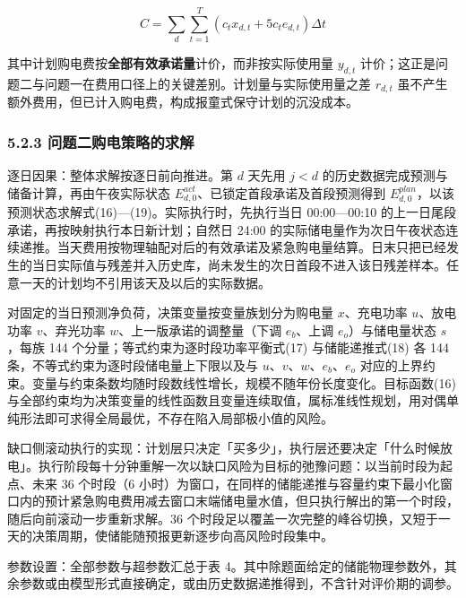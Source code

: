 \documentclass[12pt,a4paper]{ctexart}
\begin{document}
\begin{equation}
C=\sum_{d}\sum_{t=1}^{T}\left(c_t x_{d,t}+5c_t e_{d,t}\right)\Delta t
\end{equation}

其中计划购电费按\textbf{全部有效承诺量}计价，而非按实际使用量 $y_{d,t}$ 计价；这正是问题二与问题一在费用口径上的关键差别。计划量与实际使用量之差 $r_{d,t}$ 虽不产生额外费用，但已计入购电费，构成报童式保守计划的沉没成本。

\subsubsection*{5.2.3 问题二购电策略的求解}

逐日因果：整体求解按逐日前向推进。第 $d$ 天先用 $j<d$ 的历史数据完成预测与储备计算，再由午夜实际状态 $E^{act}_{d,0}$、已锁定首段承诺及首段预测得到 $E^{plan}_{d,0}$，以该预测状态求解式(16)—(19)。实际执行时，先执行当日 00:00—00:10 的上一日尾段承诺，再按映射执行本日新计划；自然日 24:00 的实际储电量作为次日午夜状态连续递推。当天费用按物理轴配对后的有效承诺及紧急购电量结算。日末只把已经发生的当日实际值与残差并入历史库，尚未发生的次日首段不进入该日残差样本。任意一天的计划均不引用该天及以后的实际数据。

对固定的当日预测净负荷，决策变量按变量族划分为购电量 $x$、充电功率 $u$、放电功率 $v$、弃光功率 $w$、上一版承诺的调整量（下调 $e_b$、上调 $e_o$）与储电量状态 $s$，每族 144 个分量；等式约束为逐时段功率平衡式(17) 与储能递推式(18) 各 144 条，不等式约束为逐时段储电量上下限以及与 $u$、$v$、$w$、$e_b$、$e_o$ 对应的上界约束。变量与约束条数均随时段数线性增长，规模不随年份长度变化。目标函数(16) 与全部约束均为决策变量的线性函数且变量连续取值，属标准线性规划，用对偶单纯形法即可求得全局最优，不存在陷入局部极小值的风险。

缺口侧滚动执行的实现：计划层只决定「买多少」，执行层还要决定「什么时候放电」。执行阶段每十分钟重解一次以缺口风险为目标的弛豫问题：以当前时段为起点、未来 36 个时段（6 小时）为窗口，在同样的储能递推与容量约束下最小化窗口内的预计紧急购电费用减去窗口末端储电量水值，但只执行解出的第一个时段，随后向前滚动一步重新求解。36 个时段足以覆盖一次完整的峰谷切换，又短于一天的决策周期，使储能随预报更新逐步向高风险时段集中。

参数设置：全部参数与超参数汇总于表 4。其中除题面给定的储能物理参数外，其余参数或由模型形式直接确定，或由历史数据递推得到，不含针对评价期的调参。
\end{document}
